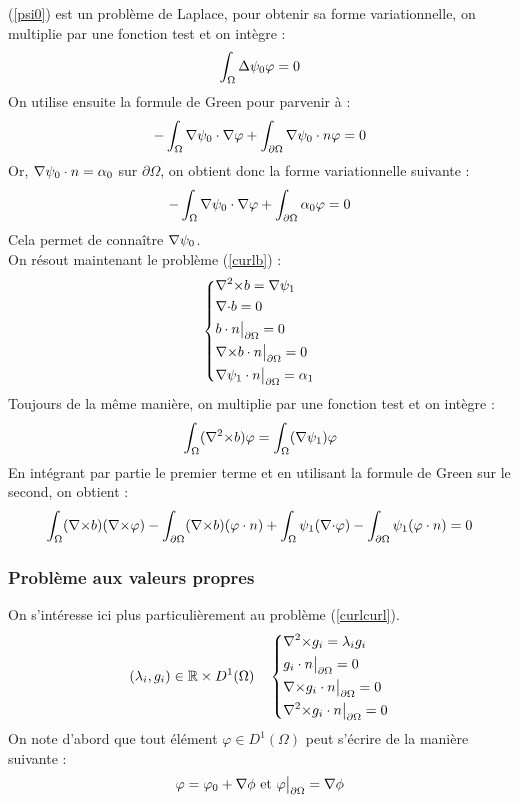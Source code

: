(\ref{psi0}) est un problème de Laplace, pour obtenir sa forme variationnelle, on multiplie par une fonction test et on intègre :
\[
\int_\Omega {\Delta}\psi_0 \varphi = 0
\]
On utilise ensuite la formule de Green pour parvenir à :
\[
-\int_\Omega {\nabla}\psi_0\cdot{\nabla}\varphi + \int_{\partial\Omega} {\nabla}\psi_0\cdot n\varphi = 0
\]
Or, ${\nabla}\psi_0\cdot n = \alpha_0$ sur $\partial\Omega$, on obtient donc la forme variationnelle suivante :
\begin{eqnarray}
\label{fvpsi}
-\int_\Omega {\nabla}\psi_0\cdot{\nabla}\varphi + \int_{\partial\Omega} \alpha_0\varphi = 0
\end{eqnarray}
Cela permet de connaître ${\nabla}\psi_0$.\\

On résout maintenant le problème (\ref{curlb}) :
\begin{eqnarray*}
\left\{
\begin{aligned}
&{\nabla^2\times} b = {\nabla}\psi_1\\
&{\nabla\cdot} b = 0\\
&b\cdot n{\big\rvert_{\partial\Omega}} = 0\\
&{\nabla\times} b\cdot n{\big\rvert_{\partial\Omega}} = 0\\
&{\nabla}\psi_1\cdot n{\big\rvert_{\partial\Omega}} = \alpha_1
\end{aligned}
\right.
\end{eqnarray*}
Toujours de la même manière, on multiplie par une fonction test et on intègre :
\[
\int_\Omega ({\nabla^2\times} b) \varphi = \int_\Omega ({\nabla}\psi_1)\varphi
\]
En intégrant par partie le premier terme et en utilisant la formule de Green sur le second, on obtient :
\begin{eqnarray}
\label{fvrelev}
\int_\Omega ({\nabla\times} b)({\nabla\times}\varphi) - \int_{\partial\Omega} ({\nabla\times} b)(\varphi\cdot n) +\int_\Omega \psi_1({\nabla\cdot}\varphi) - \int_{\partial\Omega} \psi_1(\varphi\cdot n) = 0
\end{eqnarray}

\subsubsection{Problème aux valeurs propres}
\label{eigen}

On s'intéresse ici plus particulièrement au problème (\ref{curlcurl}).
\begin{eqnarray*}
(\lambda_i,g_i)\in{\mathbb{R}}\times D^1(\Omega)\quad \left\{
\begin{aligned}
&{\nabla^2\times}  g_i = \lambda_i g_i\\
&g_i\cdot n{\big\rvert_{\partial\Omega}} = 0\\
&{\nabla\times} g_i\cdot n{\big\rvert_{\partial\Omega}} = 0\\
&{\nabla^2\times}  g_i\cdot n{\big\rvert_{\partial\Omega}} = 0
\end{aligned}
\right.
\end{eqnarray*}
On note d'abord que tout élément $\varphi\in D^1(\Omega)$ peut s'écrire de la manière suivante :
\[
\varphi = \varphi_0 + {\nabla}\phi\text{ et } \varphi{\big\rvert_{\partial\Omega}} = {\nabla}\phi
\]

